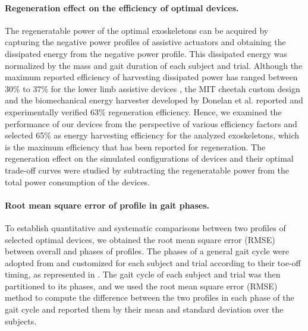 \documentclass[10pt,letterpaper]{article}
\begin{document}
\paragraph*{Regeneration effect on the efficiency of optimal devices.} 
The regeneratable power of the optimal exoskeletons can be acquired by capturing the negative power profiles of assistive actuators and obtaining the dissipated energy from the negative power profile. This dissipated energy was normalized by the mass and gait duration of each subject and trial. Although the maximum reported efficiency of harvesting dissipated power has ranged between 30\% to 37\% for the lower limb assistive devices \cite{140}, the MIT cheetah custom design \cite{144,145} and the biomechanical energy harvester developed by Donelan et al. \cite{143} reported and experimentally verified 63\% regeneration efficiency. Hence, we examined the performance of our devices from the perspective of various efficiency factors and selected 65\% as energy harvesting efficiency for the analyzed exoskeletons, which is the maximum efficiency that has been reported for regeneration. The regeneration effect on the simulated configurations of devices and their optimal trade-off curves were studied by subtracting the regeneratable power from the total power consumption of the devices.\\
\paragraph*{Root mean square error of profile in gait phases.}  To establish quantitative and systematic comparisons between two profiles of selected optimal devices, we obtained the root mean square error (RMSE) between overall and phases of profiles. The phases of a general gait cycle were adopted from \cite{150,161} and customized for each subject and trial according to their toe-off timing, as represented in . The gait cycle of each subject and trial was then partitioned to its phases, and we used the root mean square error (RMSE) method to compute the difference between the two profiles in each phase of the gait cycle and reported them by their mean and standard deviation over the subjects.
\end{document}
